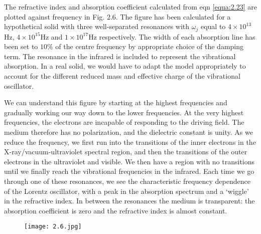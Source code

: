 \documentclass[12pt]{book}
\begin{document}
The refractive index and absorption coefficient calculated from eqn \ref{equa:2.23} are plotted against frequency in Fig. 2.6. The figure has been calculated for a hypothetical solid with three well-separated resonances with $\omega_j$ equal to $4\times 10^{13}$Hz, $4\times10^{15}$Hz and $1\times10^{17}$Hz respectively. The width of each absorption line has been set to $10\%$ of the centre frequency by appropriate choice of the damping term. The resonance in the infrared is included to represent the vibrational absorption. In a real solid, we would have to adapt the model appropriately to account for the different reduced mass and effective charge of the vibrational oscillator.

We can understand this figure by starting at the highest frequencies and gradually working our way down to the lower frequencies. At the very highest frequencies, the electrons are incapable of responding to the driving field. The medium therefore has no polarization, and the dielectric constant is unity. As we reduce the frequency, we first run into the transitions of the inner electrons in the X-ray/vacuum-ultraviolet spectral region, and then the transitions of the outer electrons in the ultraviolet and visible. We then have a region with no transitions until we finally reach the vibrational frequencies in the infrared. Each time we go through one of these resonances, we see the characteristic frequency dependence of the Lorentz oscillator, with a peak in the absorption spectrum and a `wiggle' in the refractive index. In between the resonances the medium is transparent: the absorption coefficient is zero and the refractive index is almost constant.
\begin{figure}[htbp]
  \texttt{[image: 2.6.jpg]}\\
  \label{fig:2.6}
\end{figure}
\end{document}
